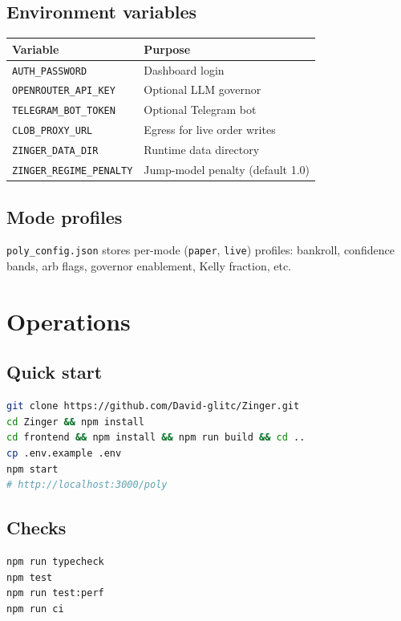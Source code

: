 \documentclass[11pt,a4paper]{report}
\begin{document}
\section{Environment variables}

\begin{longtable}{@{}lp{8cm}@{}}
\toprule
Variable & Purpose \\
\midrule
\endhead
\texttt{AUTH\_PASSWORD} & Dashboard login \\
\texttt{OPENROUTER\_API\_KEY} & Optional LLM governor \\
\texttt{TELEGRAM\_BOT\_TOKEN} & Optional Telegram bot \\
\texttt{CLOB\_PROXY\_URL} & Egress for live order writes \\
\texttt{ZINGER\_DATA\_DIR} & Runtime data directory \\
\texttt{ZINGER\_REGIME\_PENALTY} & Jump-model penalty (default 1.0) \\
\bottomrule
\end{longtable}

\section{Mode profiles}

\texttt{poly\_config.json} stores per-mode (\texttt{paper}, \texttt{live}) profiles:
bankroll, confidence bands, arb flags, governor enablement, Kelly fraction, etc.

\chapter{Operations}

\section{Quick start}

\begin{lstlisting}[language=bash]
git clone https://github.com/David-glitc/Zinger.git
cd Zinger && npm install
cd frontend && npm install && npm run build && cd ..
cp .env.example .env
npm start
# http://localhost:3000/poly
\end{lstlisting}

\section{Checks}

\begin{lstlisting}[language=bash]
npm run typecheck
npm test
npm run test:perf
npm run ci
\end{lstlisting}
\end{document}
